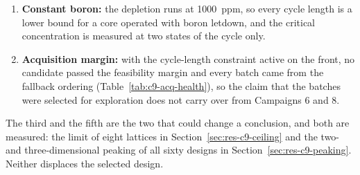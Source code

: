 \begin{enumerate}
  \item \textbf{Constant boron:} the depletion runs at \SI{1000}{ppm},
        so every cycle length is a lower bound for a core operated with
        boron letdown, and the critical concentration is measured at
        two states of the cycle only.

  \item \textbf{Acquisition margin:} with the cycle-length constraint
        active on the front, no candidate passed the feasibility margin
        and every batch came from the fallback ordering
        (Table~\ref{tab:c9-acq-health}), so the claim that the batches
        were selected for exploration does not carry over from
        Campaigns 6 and 8.
\end{enumerate}

The third and the fifth are the two that could change a conclusion, and
both are measured: the limit of eight lattices in
Section~\ref{sec:res-c9-ceiling} and the two- and three-dimensional
peaking of all sixty designs in Section~\ref{sec:res-c9-peaking}.
Neither displaces the selected design.
